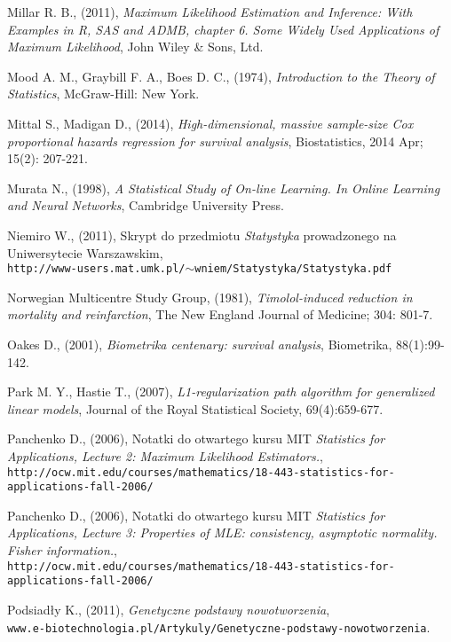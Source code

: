 \begin{thebibliography}{99}
 Millar R. B., (2011), \textit{Maximum Likelihood Estimation and Inference: With Examples in R, SAS and ADMB, chapter 6. Some Widely Used Applications of Maximum Likelihood}, John Wiley \& Sons, Ltd.

 Mood A. M., Graybill F. A., Boes D. C., (1974), \textit{Introduction to the Theory of Statistics},
McGraw-Hill: New York.

 Mittal S., Madigan D., (2014), \textit{High-dimensional, massive sample-size Cox proportional hazards regression for survival analysis}, Biostatistics, 2014 Apr; 15(2): 207-221.

 Murata N., (1998), \textit{A Statistical Study of On-line Learning. In Online Learning
and Neural Networks}, Cambridge University Press.

 Niemiro W., (2011), Skrypt do przedmiotu \textit{Statystyka} prowadzonego na Uniwersytecie Warszawskim, \\ \texttt{http://www-users.mat.umk.pl/$\sim$wniem/Statystyka/Statystyka.pdf}

 Norwegian Multicentre Study Group, (1981), \textit{Timolol-induced reduction in
mortality and reinfarction}, The New England  Journal of Medicine; 304: 801-7.

 Oakes D., (2001), \textit{Biometrika centenary: survival analysis}, Biometrika, 88(1):99-142.


 Park M. Y., Hastie T., (2007), \textit{L1-regularization path algorithm for generalized linear models}, Journal of the Royal Statistical Society, 69(4):659-677.

 Panchenko D., (2006), Notatki do otwartego kursu MIT \textit{Statistics for Applications, Lecture 2: Maximum Likelihood Estimators.}, \\
\texttt{http://ocw.mit.edu/courses/mathematics/18-443-statistics-for-applications-fall-2006/}

 Panchenko D., (2006), Notatki do otwartego kursu MIT \textit{Statistics for Applications, Lecture 3: Properties of MLE: consistency, asymptotic normality. Fisher information.}, \\
\texttt{http://ocw.mit.edu/courses/mathematics/18-443-statistics-for-applications-fall-2006/}

 Podsiadły K., (2011), \textit{Genetyczne podstawy nowotworzenia}, \\ \texttt{www.e-biotechnologia.pl/Artykuly/Genetyczne-podstawy-nowotworzenia}.


\end{thebibliography}

